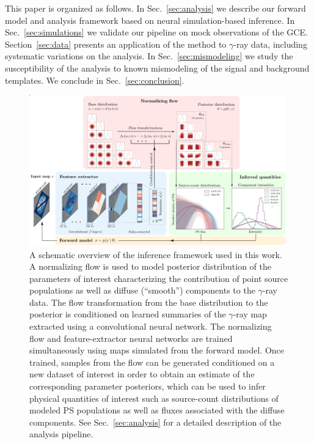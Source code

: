 \documentclass[prd,aps,10pt,nofootinbib,twocolumn,superscriptaddress,preprintnumbers,balancelastpage,longbibliography,floatfix]{revtex4-2}
\begin{document}
This paper is organized as follows. In Sec.~\ref{sec:analysis} we describe our forward model and analysis framework based on neural simulation-based inference. In Sec.~\ref{sec:simulations} we validate our pipeline on mock observations of the \Fermi GCE. Section~\ref{sec:data} presents an application of the method to \Fermi $\gamma$-ray data, including systematic variations on the analysis. In Sec.~\ref{sec:mismodeling} we study the susceptibility of the analysis to known mismodeling of the signal and background templates. We conclude in Sec.~\ref{sec:conclusion}.

%
\begin{figure}
\centering
\includegraphics[width=0.99\textwidth]{figure.pdf}
\caption{A schematic overview of the inference framework used in this work. A normalizing flow is used to model posterior distribution of the parameters of interest characterizing the contribution of point source populations as well as diffuse (``smooth'') components to the $\gamma$-ray data. The flow transformation from the base distribution to the posterior is conditioned on learned summaries of the $\gamma$-ray map extracted using a convolutional neural network. The normalizing flow and feature-extractor neural networks are trained simultaneously using maps simulated from the forward model. Once trained, samples from the flow can be generated conditioned on a new dataset of interest in order to obtain an estimate of the corresponding parameter posteriors, which can be used to infer physical quantities of interest such as source-count distributions of modeled PS populations as well as fluxes associated with the diffuse components. See Sec.~\ref{sec:analysis} for a detailed description of the analysis pipeline.}
\label{fig:figure}
\end{figure}
%
\end{document}
